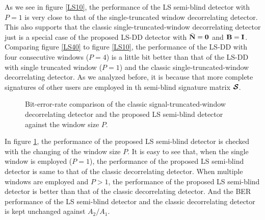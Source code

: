 \documentclass[a4paper,11pt,fleqn]{article}
\newcommand{\bN}{{\bf N}}
\newcommand{\bI}{{\bf I}}
\newcommand{\bB}{{\bf B}}
\newcommand{\bcS}{{\mbox {\boldmath ${\cal S}$}}}
\begin{document}
As we see in figure \ref{LS10}, the performance of the LS
semi-blind detector with $P=1$ is very close to that of the
single-truncated window decorrelating detector. This also supports
that the classic single-truncated-window decorrelating detector
just is a special case of the proposed LS-DD detector with
$\bar{\bN} = \mathbf{0}$ and $\bB=\bI$. Comparing figure
\ref{LS40} to figure \ref{LS10}, the performance of the LS-DD with
four consecutive windows ($P=4$) is a little bit better than that
of the LS-DD with single truncated window ($P=1$) and the classic
single-truncated-window decorrelating detector. As we analyzed
before, it is because that more complete signatures of other users
are employed in th semi-blind signature matrix $\bcS$.

\begin{figure}
\caption{Bit-error-rate comparison of the classic
signal-truncated-window decorrelating detector and the proposed LS
semi-blind detector against the window size $P$.} \label{P0}
\end{figure}

In figure \ref{P0}, the performance of the proposed LS semi-blind
detector is checked with the changing of the window size $P$. It
is easy to see that, when the single window is employed ($P=1$),
the performance of the proposed LS semi-blind detector is same to
that of the classic decorrelating detector. When multiple windows
are employed and $P>1$, the performance of the proposed LS
semi-blind detector is better than that of the classic
decorrelating detector. And the BER performance of the LS
semi-blind detector and the classic decorrelating detector is kept
unchanged against $A_2/A_1$.
\end{document}
